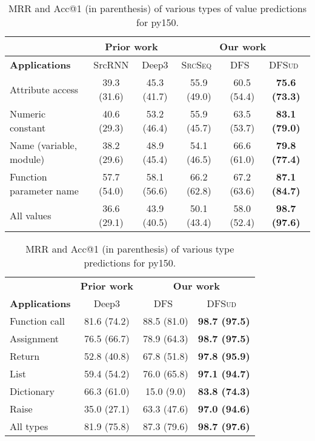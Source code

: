 \documentclass[nonacm, sigconf]{acmart}
\newcommand{\abbr}[1]{\textsc{#1}~}
\newcommand{\SrcSeq}{\abbr{SrcSeq}} \newcommand{\SrcRNN}{\abbr{SrcRNN}} \newcommand{\LeafSeq}{\abbr{LeafSeq}} \newcommand{\RootPath}{\abbr{RootPath}} \newcommand{\LeafTokens}{\abbr{LeafTokens}} \newcommand{\DFS}{\abbr{DFS}} \newcommand{\TreeRel}{\abbr{DFS{ud}}} \newcommand{\TreeReli}{\abbr{DFS{ud+}}}
\begin{document}
\begin{table*}[h]
    \centering
    \begin{tabular}{l|cc|ccc}
    \hline
                     & \multicolumn{2}{c}{\textbf{Prior work}} & \multicolumn{3}{c}{\textbf{Our work}} \\
    \hline
      \textbf{Applications} & SrcRNN  & Deep3  & \SrcSeq  & \DFS   & \TreeRel         \\
    \hline
      Attribute access        & 39.3 (31.6) & 45.3 (41.7) & 55.9 (49.0) & 60.5 (54.4) & \textbf{75.6 (73.3)}  \\
      Numeric constant        & 40.6 (29.3) & 53.2 (46.4) & 55.9 (45.7)	& 63.5 (53.7) &	\textbf{83.1 (79.0)}  \\
      Name (variable, module) & 38.2 (29.6) & 48.9 (45.4) & 54.1 (46.5)	& 66.6 (61.0) &	\textbf{79.8 (77.4)}  \\
      Function parameter name & 57.7 (54.0)  & 58.1 (56.6) & 66.2 (62.8)	& 67.2 (63.6) & \textbf{87.1 (84.7)}  \\
      All values               & 36.6 (29.1)  & 43.9 (40.5) & 50.1 (43.4)	& 58.0 (52.4) &	\textbf{98.7 (97.6)} \\
    \hline
    \end{tabular}
    \caption{MRR and Acc@1 (in parenthesis) of various types of value predictions for py150.}
    \label{tab:resultspy150_values}
\end{table*}


\begin{table*}[h]
    \centering
    \begin{tabular}{l|c|cc}
    \hline
                     & \textbf{Prior work} & \multicolumn{2}{c}{\textbf{Our work}} \\
      \textbf{Applications}   & Deep3 & \DFS & \TreeRel  \\
    \hline
      Function call    & 81.6 (74.2) & 88.5 (81.0)	& \textbf{98.7 (97.5)}   \\
      Assignment       & 76.5 (66.7) & 78.9 (64.3)	& \textbf{98.7 (97.5)}   \\
      Return           & 52.8 (40.8) & 67.8 (51.8)	& \textbf{97.8 (95.9)}   \\
      List             & 59.4 (54.2) & 76.0 (65.8)	& \textbf{97.1 (94.7)}   \\
      Dictionary       & 66.3 (61.0) & 15.0 (9.0)	& \textbf{83.8 (74.3)}   \\
      Raise            & 35.0 (27.1) & 63.3 (47.6)	& \textbf{97.0 (94.6)}   \\
      All types        & 81.9 (75.8) & 87.3 (79.6)	& \textbf{98.7 (97.6)}   \\
    \hline
    \end{tabular}
    \caption{MRR and Acc@1 (in parenthesis) of various type predictions for py150.}
    \label{tab:resultspy150_types}
\end{table*}
\end{document}
